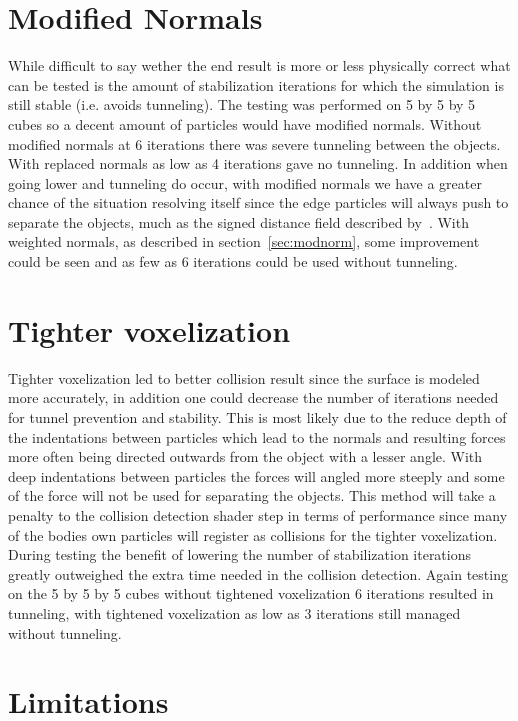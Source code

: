 \section{Modified Normals}
While difficult to say wether the end result is more or less physically correct
what can be tested is the amount of stabilization iterations for which the simulation
is still stable (i.e. avoids tunneling). The testing was performed on 5 by 5 by 5
cubes so a decent amount of particles would have modified normals. Without modified
normals at 6 iterations there was severe tunneling between the objects. With replaced normals
 as low as 4 iterations gave no tunneling. In addition when going lower
 and tunneling do occur, with modified normals we have a greater chance of the
 situation resolving itself since the edge particles will always push to separate
 the objects, much as the signed distance field described by~\cite{flex}.
 With weighted normals, as described in section~\ref{sec:modnorm}, some improvement
 could be seen and as few as 6 iterations could be used without tunneling.

\section{Tighter voxelization}
Tighter voxelization led to better collision result since the surface is modeled
more accurately, in addition one could decrease the number of iterations needed
for tunnel prevention and stability. This is most likely due to the reduce depth
of the indentations between particles which lead to the normals and resulting forces more often
being directed outwards from the object with a lesser angle.
 With deep indentations between particles the forces will angled more steeply and
  some of the force will not be used for separating the objects.
This method will take a penalty to the collision detection shader step in
terms of performance since many of the bodies own particles will register as collisions
for the tighter voxelization. During testing the benefit of lowering the number of
stabilization iterations greatly outweighed the extra time needed in the collision
detection. Again testing on the 5 by 5 by 5 cubes without tightened voxelization 6 iterations resulted in
tunneling, with tightened voxelization as low as 3 iterations still managed without tunneling.

\section{Limitations}

